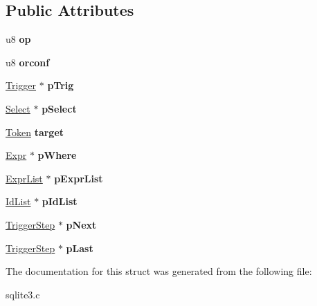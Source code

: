 \subsection*{Public Attributes}
\begin{DoxyCompactItemize}
\item 
\hypertarget{struct_trigger_step_a20269855c80d869d498fcb93401832fd}{u8 {\bfseries op}}\label{struct_trigger_step_a20269855c80d869d498fcb93401832fd}

\item 
\hypertarget{struct_trigger_step_a4ed8b2571fde96e84f637184453e73e3}{u8 {\bfseries orconf}}\label{struct_trigger_step_a4ed8b2571fde96e84f637184453e73e3}

\item 
\hypertarget{struct_trigger_step_a70671e85796776db06c732ab6ae4ae0d}{\hyperlink{struct_trigger}{Trigger} $\ast$ {\bfseries p\-Trig}}\label{struct_trigger_step_a70671e85796776db06c732ab6ae4ae0d}

\item 
\hypertarget{struct_trigger_step_a90bf3353653cedf364a7fb2eb89a19c4}{\hyperlink{struct_select}{Select} $\ast$ {\bfseries p\-Select}}\label{struct_trigger_step_a90bf3353653cedf364a7fb2eb89a19c4}

\item 
\hypertarget{struct_trigger_step_a8b860bb5f466b1522125d446b58d860a}{\hyperlink{struct_token}{Token} {\bfseries target}}\label{struct_trigger_step_a8b860bb5f466b1522125d446b58d860a}

\item 
\hypertarget{struct_trigger_step_ad4c293b04dfda535f3aad5b9e02726c7}{\hyperlink{struct_expr}{Expr} $\ast$ {\bfseries p\-Where}}\label{struct_trigger_step_ad4c293b04dfda535f3aad5b9e02726c7}

\item 
\hypertarget{struct_trigger_step_a607602af65ecf6c7e6cac4ea8532ac1d}{\hyperlink{struct_expr_list}{Expr\-List} $\ast$ {\bfseries p\-Expr\-List}}\label{struct_trigger_step_a607602af65ecf6c7e6cac4ea8532ac1d}

\item 
\hypertarget{struct_trigger_step_a6b91bf578544104f8bd4bd5b958ddd8c}{\hyperlink{struct_id_list}{Id\-List} $\ast$ {\bfseries p\-Id\-List}}\label{struct_trigger_step_a6b91bf578544104f8bd4bd5b958ddd8c}

\item 
\hypertarget{struct_trigger_step_a0757a0d22dbe2f7f57706014dd35759b}{\hyperlink{struct_trigger_step}{Trigger\-Step} $\ast$ {\bfseries p\-Next}}\label{struct_trigger_step_a0757a0d22dbe2f7f57706014dd35759b}

\item 
\hypertarget{struct_trigger_step_a0aae9ea7f436881c0e9e614476a69584}{\hyperlink{struct_trigger_step}{Trigger\-Step} $\ast$ {\bfseries p\-Last}}\label{struct_trigger_step_a0aae9ea7f436881c0e9e614476a69584}

\end{DoxyCompactItemize}


The documentation for this struct was generated from the following file\-:\begin{DoxyCompactItemize}
\item 
sqlite3.\-c\end{DoxyCompactItemize}
